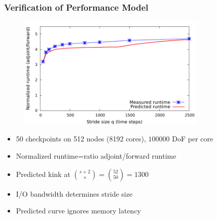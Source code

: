 \begin{frame}
  \frametitle{Verification of Performance Model}
  \begin{figure}
    \centering
    \includegraphics[width=0.8\textwidth]{./figures/revolve}
    \label{fig:revolve}
  \end{figure}
  \begin{itemize}
    \item 50 checkpoints on 512 nodes (8192 cores), $100000$ DoF per core
    \item Normalized runtime=ratio adjoint/forward runtime
    \item Predicted kink at $\binom{s+2}{s}=\binom{52}{50}=1300$
    \item I/O \alert{bandwidth} determines stride size
    \item Predicted curve ignores memory latency
  \end{itemize}
\end{frame}

